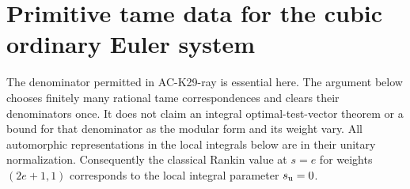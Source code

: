 \section{Primitive tame data for the cubic ordinary Euler system}
\label{sec:cubic-primitive-euler}

The denominator permitted in AC-K29-ray is essential here.
The argument below chooses finitely many rational tame
correspondences and clears their denominators once.  It does not
claim an integral optimal-test-vector theorem or a bound for that
denominator as the modular form and its weight vary.
All automorphic representations in the local integrals below
are in their unitary normalization.  Consequently the classical
Rankin value at $s=e$ for weights $(2e+1,1)$ corresponds to the
local integral parameter $s_{\rm u}=0$.

